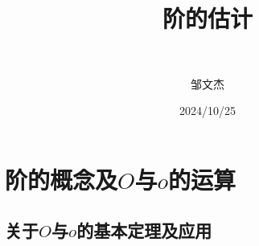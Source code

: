 \documentclass[lang=cn,newtx,10pt,scheme=chinese]{../Template/elegantbook}
\title{阶的估计}
\subtitle{\,\,}
\author{邹文杰}
\institute{无}
\date{2024/10/25}
\begin{document}
\maketitle
\frontmatter

\tableofcontents

\mainmatter
\everymath{\displaystyle} %

\chapter{阶的概念及$O$与$o$的运算}

\section{关于$O$与$o$的基本定理及应用}
\end{document}
